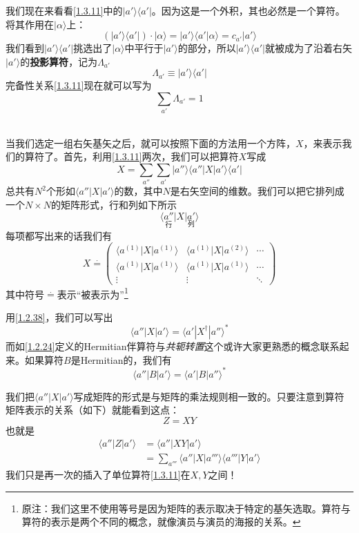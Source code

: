 \documentclass[UTF8,twoside]{ctexart}
\def\be{\begin{equation}}
\def\ee{\end{equation}}
\begin{document}
我们现在来看看\eqref{1.3.11}中的$|a'\rangle\langle a'|$。因为这是一个外积，其也必然是一个算符。将其作用在$|\alpha\rangle$上：
\be
(|a'\rangle\langle a'|)\cdot|\alpha\rangle = |a'\rangle\langle a'|\alpha\rangle = c_{a'}|a'\rangle
\ee
我们看到$|a'\rangle\langle a'|$挑选出了$|\alpha\rangle$中平行于$|a'\rangle$的部分，所以$|a'\rangle\langle a'|$就被成为了沿着右矢$|a'\rangle$的{\bf 投影算符}，记为$\Lambda_{a'}$
\be
\Lambda_{a'}\equiv|a'\rangle\langle a'|
\ee
完备性关系\eqref{1.3.11}现在就可以写为
\be
\sum_{a'}\Lambda_{a'}=1
\ee
\ \\


\noindent 当我们选定一组右矢基矢之后，就可以按照下面的方法用一个方阵，$X$，来表示我们的算符了。首先，利用\eqref{1.3.11}两次，我们可以把算符$X$写成
\be
X = \sum_{a''}\sum_{a'}|a''\rangle\langle a''|X|a'\rangle\langle a'|
\ee
总共有$N^2$个形如$\langle a''|X|a'\rangle$的数，其中$N$是右矢空间的维数。我们可以把它排列成一个$N\times N$的矩阵形式，行和列如下所示
\be
\langle \underset{\text{行}}{a''}|X|\underset{\text{列}}{a'}\rangle
\ee
每项都写出来的话我们有
\be
X \overset{\cdot}{=}\left(\begin{matrix}
\langle a^{(1)}|X|a^{(1)}\rangle & \langle a^{(1)}|X|a^{(2)}\rangle & \cdots\\
\langle a^{(1)}|X|a^{(1)}\rangle & \langle a^{(1)}|X|a^{(1)}\rangle & \cdots\\
\vdots & \vdots & \ddots \end{matrix}\right)
\ee
其中符号$\overset{\cdot}{=}$表示``被表示为''\footnote{原注：我们这里不使用等号是因为矩阵的表示取决于特定的基矢选取。算符与算符的表示是两个不同的概念，就像演员与演员的海报的关系。}

用\eqref{1.2.38}，我们可以写出
\be
\langle a''|X|a'\rangle = \langle a'|X^\dagger|a''\rangle^*
\ee
而如\eqref{1.2.24}定义的Hermitian伴算符与{\it 共轭转置}这个或许大家更熟悉的概念联系起来。如果算符$B$是Hermitian的，我们有
\be
\langle a''|B|a'\rangle = \langle a'|B|a''\rangle^*
\ee

我们把$\langle a''|X|a'\rangle$写成矩阵的形式是与矩阵的乘法规则相一致的。只要注意到算符矩阵表示的关系（如下）就能看到这点：
\be
Z = XY
\ee
也就是
\be\begin{split}
\langle a''|Z|a'\rangle &= \langle a''|XY|a'\rangle\\
&=\sum_{a'''}\langle a''|X|a'''\rangle\langle a'''|Y|a'\rangle
\end{split}\ee
我们只是再一次的插入了单位算符\eqref{1.3.11}在$X, Y$之间！
\end{document}
